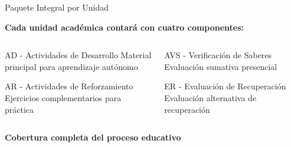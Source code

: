\documentclass[10pt,aspectratio=169]{beamer}
\begin{document}
\begin{frame}{Paquete Integral por Unidad}
	\begin{center}
		\textbf{Cada unidad académica contará con cuatro componentes:}
	\end{center}
	
	\vspace{0.5cm}
	
	\begin{columns}
		\begin{column}{0.5\textwidth}
			\begin{block}{AD - Actividades de Desarrollo}
				Material principal para aprendizaje autónomo
			\end{block}
			
			\begin{block}{AR - Actividades de Reforzamiento}
				Ejercicios complementarios para práctica
			\end{block}
		\end{column}
		
		\begin{column}{0.5\textwidth}
			\begin{block}{AVS - Verificación de Saberes}
				Evaluación sumativa presencial
			\end{block}
			
			\begin{block}{ER - Evaluación de Recuperación}
				Evaluación alternativa de recuperación
			\end{block}
		\end{column}
	\end{columns}
	
	\vspace{0.5cm}
	
	\begin{center}
		\textcolor{verdeExito}{\textbf{Cobertura completa del proceso educativo}}
	\end{center}
\end{frame}
\end{document}
